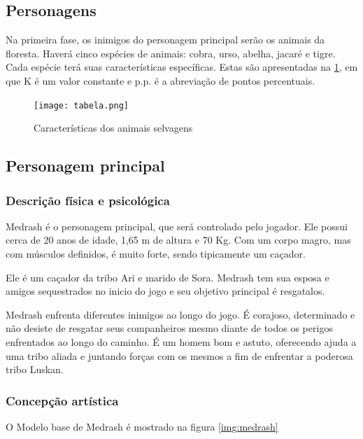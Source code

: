 \subsection{Personagens}
Na primeira fase, os inimigos do personagem principal serão os animais da floresta. 
Haverá cinco espécies de animais: cobra, urso, abelha, jacaré e tigre. Cada espécie 
terá suas características específicas. Estas são apresentadas na \ref{img:tabela}, em que K 
é um valor constante e p.p. é a abreviação de pontos percentuais.

\begin{figure}[H]
 \centering
 \texttt{[image: tabela.png]}
 \caption{Características dos animais selvagens}
 \label{img:tabela}
\end{figure}

\subsection{Personagem principal}
\subsubsection{Descrição física e psicológica}
Medrash é o personagem principal, que será controlado pelo jogador. Ele
 possui cerca de 20 anos de idade, 1,65 m de altura e 70 Kg. Com um corpo
 magro, mas com músculos definidos, é muito forte, sendo tipicamente um
 caçador.

Ele é um caçador da tribo Ari e marido de Sora. Medrash tem sua esposa e
 amigos sequestrados no inicio do jogo e seu objetivo principal é 
resgatalos.

Medrash enfrenta diferentes inimigos ao longo do jogo. É corajoso,
 determinado e não desiste de resgatar seus companheiros mesmo diante de
 todos os perigos enfrentados ao longo do caminho. É um homem bom e astuto,
 oferecendo ajuda a uma tribo aliada e juntando forças com os mesmos a fim
 de enfrentar a poderosa tribo Luskan.

\subsubsection{Concepção artística}
O Modelo base de Medrash é mostrado na figura \ref{img:medrash}

